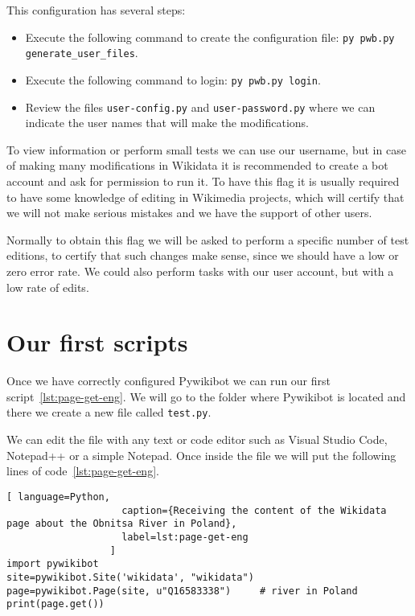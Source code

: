 This configuration has several steps:
\begin{itemize}
  \setlength{\itemindent}{2em}
  \item Execute the following command to create the configuration file: \lstinline|py pwb.py generate_user_files|.
  \item Execute the following command to login: \lstinline|py pwb.py login|.
  \item Review the files \lstinline|user-config.py| and \lstinline|user-password.py| where we can indicate the user names that will make the modifications.
\end{itemize}

To view information or perform small tests we can use our username, but in case of making many modifications in Wikidata it is recommended to create a bot account and ask for permission to run it. To have this flag it is usually required to have some knowledge of editing in Wikimedia projects, which will certify that we will not make serious mistakes and we have the support of other users.

Normally to obtain this flag we will be asked to perform a specific number of test editions, to certify that such changes make sense, since we should have a low or zero error rate. We could also perform tasks with our user account, but with a low rate of edits.


\section{Our first scripts}
\label{sec:firstScript}

Once we have correctly configured Pywikibot we can run our first script~\ref{lst:page-get-eng}. 
We will go to the folder where Pywikibot is located and there we create a new file called \lstinline|test.py|.

We can edit the file with any text or code editor such as Visual Studio Code, Notepad++ or a simple Notepad.
Once inside the file we will put the following lines of code~\ref{lst:page-get-eng}.

%
\renewcommand{\lstlistingname}{Listing} %
\begin{lstlisting}[ language=Python,
                    caption={Receiving the content of the Wikidata page about the Obnitsa River in Poland},
                    label=lst:page-get-eng
                  ]
import pywikibot
site=pywikibot.Site('wikidata', "wikidata")
page=pywikibot.Page(site, u"Q16583338")     # river in Poland
print(page.get())
\end{lstlisting}
\renewcommand{\lstlistingname}{Query} %

